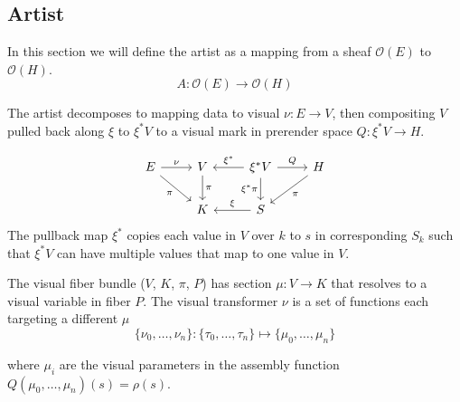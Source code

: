 \documentclass[../main.tex]{subfiles}
\begin{document}
\subsection{Artist}
\label{sec:artist}

In this section we will define the artist as a mapping from a sheaf $\mathcal{O}(E)$  to $\mathcal{O}(H)$. 
\begin{equation}
    A: \mathcal{O}(E) \rightarrow \mathcal{O}(H)
\end{equation}

The artist decomposes to mapping data to visual $\nu:E\rightarrow V$, then  compositing $V$ pulled back along $\xi$ to $\xi^*V$ to a visual mark in prerender space $Q:\xi^*V\rightarrow H$. 

\begin{equation}
    \label{eq:artist_diagram}
    \begin{tikzcd}
        E \arrow[r, "\nu"] \arrow[rd, "\pi"'] & V \arrow[d, "\pi"] & \xi^*V \arrow[r, "Q"] \arrow[d, "\xi^*\pi"'] \arrow[l, "\xi^*"'] & H \arrow[ld, "\pi"] \\
                                              & K                  & S \arrow[l, "\xi"']                                              &                    
        \end{tikzcd}
\end{equation}
The pullback map $\xi^*$ copies each value in $V$ over $k$ to $s$ in corresponding $S_k$ such that $\xi^*V$ can have multiple values that map to one value in $V$. 

The visual fiber bundle ($V$, $K$, $\pi$, $P$) has section $\mu: V \rightarrow K$ that resolves to a visual variable \cite{bertinIIPropertiesGraphic2011,munznerMarksChannels,} in fiber $P$. The visual transformer $\nu$ is a set of functions each targeting a different $\mu$
\begin{equation}
    \label{eq:nu_expanded}
    \{\nu_{0}, \ldots, \nu_{n}\}: \{\tau_{0}, \ldots, \tau_{n}\} \mapsto \{\mu_{0}, \ldots, \mu_{n}\}
\end{equation}

where $\mu_{i}$ are the visual parameters in the assembly function $Q(\mu_{0}, \ldots, \mu_{n})(s) = \rho(s)$. 
\end{document}

